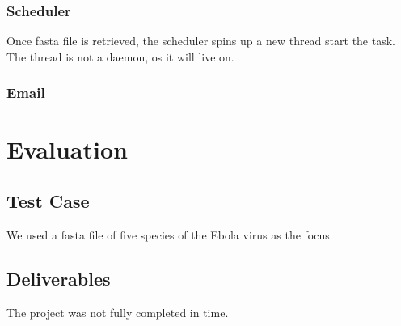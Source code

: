 \documentclass[10pt,letterpaper]{article}
\begin{document}
\subsubsection{Scheduler}


Once fasta file is retrieved, the scheduler spins up a new thread start the task. 
The thread is not a daemon, os it will live on.

\subsubsection{Email}




\section{Evaluation}

\subsection{Test Case}
We used a fasta file of five species of the Ebola virus as the focus

\subsection{Deliverables}
The project was not fully completed in time.



\end{document}
